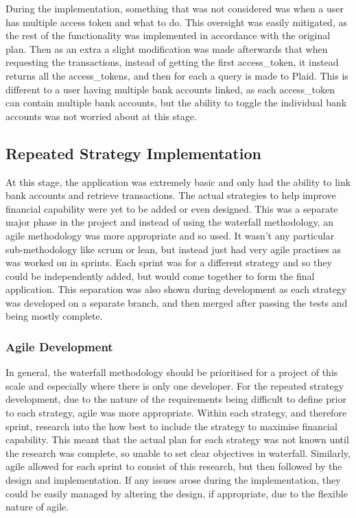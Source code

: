 During the implementation, something that was not considered was when a user has multiple access token and what to do. This oversight was easily mitigated, as the rest of the functionality was implemented in accordance with the original plan. Then as an extra a slight modification was made afterwards that when requesting the transactions, instead of getting the first access\_token, it instead returns all the access\_tokens, and then for each a query is made to Plaid. This is different to a user having multiple bank accounts linked, as each access\_token can contain multiple bank accounts, but the ability to toggle the individual bank accounts was not worried about at this stage.

\subsection{Repeated Strategy Implementation}
At this stage, the application was extremely basic and only had the ability to link bank accounts and retrieve transactions. The actual strategies to help improve financial capability were yet to be added or even designed. This was a separate major phase in the project and instead of using the waterfall methodology, an agile methodology was more appropriate and so used. It wasn't any particular sub-methodology like scrum or lean, but instead just had very agile practises as was worked on in sprints. Each sprint was for a different strategy and so they could be independently added, but would come together to form the final application. This separation was also shown during development as each strategy was developed on a separate branch, and then merged after passing the tests and being mostly complete.


\subsubsection{Agile Development}
In general, the waterfall methodology should be prioritised for a project of this scale and especially where there is only one developer. For the repeated strategy development, due to the nature of the requirements being difficult to define prior to each strategy, agile was more appropriate. Within each strategy, and therefore sprint, research into the how best to include the strategy to maximise financial capability. This meant that the actual plan for each strategy was not known until the research was complete, so unable to set clear objectives in waterfall. Similarly, agile allowed for each sprint to consist of this research, but then followed by the design and implementation. If any issues arose during the implementation, they could be easily managed by altering the design, if appropriate, due to the flexible nature of agile.

